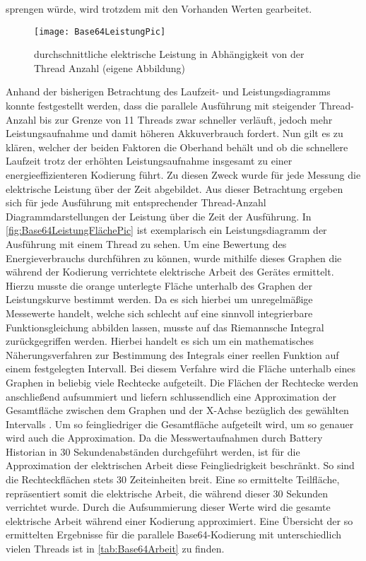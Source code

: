 sprengen würde, wird trotzdem mit den Vorhanden Werten gearbeitet. 



\begin{figure}[h]
	\begin{center}	 
	\texttt{[image: Base64LeistungPic]}
	\caption{durchschnittliche elektrische Leistung in Abhängigkeit von der Thread Anzahl (eigene Abbildung)}
	\label{fig:Base64LeistungPic} 
	\end{center}
\end{figure}

Anhand der bisherigen Betrachtung des Laufzeit- und Leistungsdiagramms konnte festgestellt werden, dass die parallele Ausführung mit steigender Thread-Anzahl bis zur Grenze von 11 Threads zwar schneller verläuft, jedoch mehr Leistungsaufnahme und damit höheren Akkuverbrauch fordert. Nun gilt es zu klären, welcher der beiden Faktoren die Oberhand behält und ob die schnellere Laufzeit trotz der erhöhten Leistungsaufnahme insgesamt zu einer energieeffizienteren Kodierung führt. Zu diesen Zweck wurde für jede Messung die elektrische Leistung über der Zeit abgebildet. Aus dieser Betrachtung ergeben sich für jede Ausführung mit entsprechender Thread-Anzahl Diagrammdarstellungen der Leistung über die Zeit der Ausführung.  In \autoref{fig:Base64LeistungFlächePic} ist exemplarisch ein Leistungsdiagramm der Ausführung mit einem Thread zu sehen. Um eine Bewertung des Energieverbrauchs durchführen zu können, wurde mithilfe dieses Graphen die während der Kodierung verrichtete elektrische Arbeit des Gerätes ermittelt. Hierzu musste die orange unterlegte Fläche unterhalb des Graphen der Leistungskurve bestimmt werden. Da es sich hierbei um unregelmäßige Messewerte handelt, welche sich schlecht auf eine sinnvoll integrierbare Funktionsgleichung abbilden lassen, musste auf das Riemannsche Integral zurückgegriffen werden. Hierbei handelt es sich um ein mathematisches Näherungsverfahren zur Bestimmung des Integrals einer reellen Funktion auf einem festgelegten Intervall. Bei diesem Verfahre wird die Fläche unterhalb eines Graphen in beliebig viele Rechtecke aufgeteilt. Die Flächen der Rechtecke werden anschließend aufsummiert und liefern schlussendlich eine Approximation der Gesamtfläche  zwischen dem Graphen und der X-Achse bezüglich des gewählten Intervalls \cite[479]{Mathebuch}. Um so feingliedriger die Gesamtfläche aufgeteilt wird, um so genauer wird auch die Approximation. Da die Messwertaufnahmen durch Battery Historian in 30 Sekundenabständen durchgeführt werden, ist für die Approximation der elektrischen Arbeit diese Feingliedrigkeit beschränkt. So sind die Rechteckflächen stets 30 Zeiteinheiten breit. Eine so ermittelte Teilfläche, repräsentiert somit die elektrische Arbeit, die während dieser 30 Sekunden verrichtet wurde. Durch die Aufsummierung dieser Werte wird die gesamte elektrische Arbeit während einer Kodierung approximiert. Eine Übersicht der so ermittelten Ergebnisse  für die parallele Base64-Kodierung mit unterschiedlich vielen Threads ist in \autoref{tab:Base64Arbeit} zu finden.


